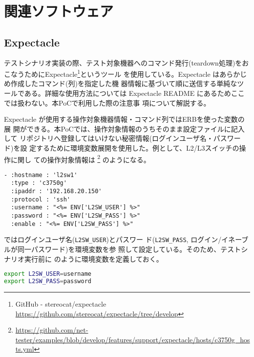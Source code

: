 
\chapter{関連ソフトウェア}

 \section{Expectacle}
 \label{sec:expectacle}

テストシナリオ実装の際、テスト対象機器へのコマンド発行(teardown処理)をお
こなうためにExpectacle\footnote{GitHub - stereocat/expectacle
\url{https://github.com/stereocat/expectacle/tree/develop}}というツール
を使用している。Expectacle はあらかじめ作成したコマンド(列)を指定した機
器情報に基づいて順に送信する単純なツールである。詳細な使用方法については
Expectacle README にあるためここでは扱わない。本PoCで利用した際の注意事
項について解説する。

Expectacle が使用する操作対象機器情報・コマンド列ではERBを使った変数の展
開ができる。本PoCでは、操作対象情報のうちそのまま設定ファイルに記入して
リポジトリへ登録してはいけない秘密情報(ログインユーザ名・パスワード)を設
定するために環境変数展開を使用した。例として、L2/L3スイッチの操作に関し
ての操作対象情報は
\footnote{\url{https://github.com/net-tester/examples/blob/develop/features/support/expectacle/hosts/c3750g_hosts.yml}}
のようになる。
\begin{lstlisting}[caption=L2スイッチ(L2SW1)ログイン情報,label=lst:l2sw1-login]
- :hostname : 'l2sw1'
  :type : 'c3750g'
  :ipaddr : '192.168.20.150'
  :protocol : 'ssh'
  :username : "<%= ENV['L2SW_USER'] %>"
  :password : "<%= ENV['L2SW_PASS'] %>"
  :enable : "<%= ENV['L2SW_PASS'] %>"
\end{lstlisting}
ではログインユーザ名(\verb|L2SW_USER|)とパスワー
ド(\verb|L2SW_PASS|, ログイン/イネーブルが同一パスワード)を環境変数を参
照して設定している。そのため、テストシナリオ実行前に
のように環境変数を定義しておく。
\begin{lstlisting}[language=sh,caption=ログイン情報環境変数の設定,label=lst:l2sw1-login-envvar]
export L2SW_USER=username
export L2SW_PASS=password
\end{lstlisting}

